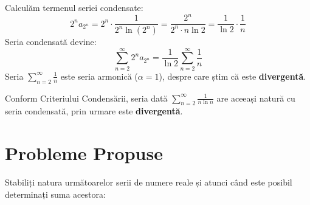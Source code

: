 \documentclass[12pt, a4paper]{report}
\begin{document}
\begin{enumerate}[label=\textbf{\roman*)}]
		Calculăm termenul seriei condensate:
		\[
		2^n a_{2^n} = 2^n \cdot \frac{1}{2^n \ln(2^n)} = \frac{2^n}{2^n \cdot n \ln 2} = \frac{1}{\ln 2} \cdot \frac{1}{n}
		\]
		Seria condensată devine:
		\[
		\sum_{n=2}^{\infty} 2^n a_{2^n} = \frac{1}{\ln 2} \sum_{n=2}^{\infty} \frac{1}{n}
		\]
		Seria $\sum_{n=2}^{\infty} \frac{1}{n}$ este seria armonică ($\alpha = 1$), despre care știm că este \textbf{divergentă}.
		
		Conform Criteriului Condensării, seria dată $\sum_{n=2}^{\infty} \frac{1}{n \ln n}$ are aceeași natură cu seria condensată, prin urmare este \textbf{divergentă}.
		
	\end{enumerate}
	
	\chapter{Probleme Propuse}
	
	Stabiliți natura următoarelor serii de numere reale și atunci când este posibil determinați suma acestora:
	
\end{document}
